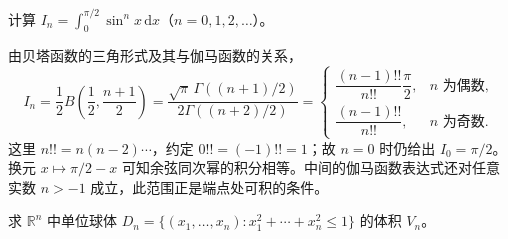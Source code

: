 \documentclass[UTF8,12pt,a4paper,fontset=fandol]{ctexbook}
\begin{document}
\begin{example}
\label{ex:beta-sine-power-integrals}
计算 $\displaystyle I_n=\int_0^{\pi/2}\sin^n x\,\mathrm{d}x$（$n=0,1,2,\ldots$）。
\end{example}

\begin{solve}
由贝塔函数的三角形式及其与伽马函数的关系，
\begin{equation}
    I_n=\frac12B\left(\frac12,\frac{n+1}{2}\right)
       =\frac{\sqrt\pi\,\Gamma((n+1)/2)}{2\Gamma((n+2)/2)}
       =\begin{cases}
           \dfrac{(n-1)!!}{n!!}\dfrac\pi2,&n\text{ 为偶数},\\
           \dfrac{(n-1)!!}{n!!},&n\text{ 为奇数}.
         \end{cases}
    \label{eq:beta-sine-power-integrals}
\end{equation}
这里 $n!!=n(n-2)\cdots$，约定 $0!!=(-1)!!=1$；故 $n=0$ 时仍给出 $I_0=\pi/2$。换元 $x\mapsto\pi/2-x$ 可知余弦同次幂的积分相等。中间的伽马函数表达式还对任意实数 $n>-1$ 成立，此范围正是端点处可积的条件。
\end{solve}

\begin{example}
\label{ex:gamma-unit-ball-volume}
求 $\mathbb R^n$ 中单位球体 $D_n=\{(x_1,\ldots,x_n):x_1^2+\cdots+x_n^2\leq1\}$ 的体积 $V_n$。
\end{example}
\end{document}
